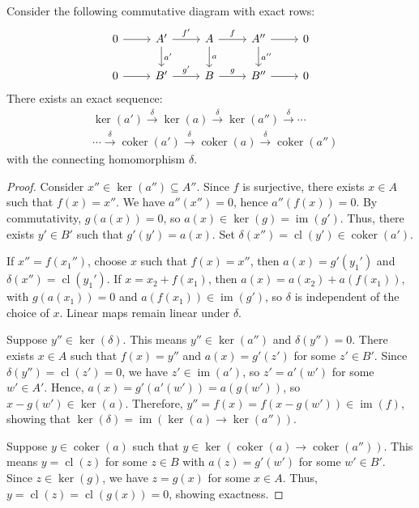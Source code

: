 \begin{lemma}{\cite[\S 1.2.6]{Weibel1994}}
\label{snake}
Consider the following commutative diagram with exact rows:
\begin{equation}
\begin{tikzcd}
0 \arrow[r] & A' \arrow[r, "f'"] \arrow[d, "a'"] & A \arrow[r, "f"] \arrow[d, "a"] & A'' \arrow[r] \arrow[d, "a''"] & 0 \\
0 \arrow[r] & B' \arrow[r, "g'"] & B \arrow[r, "g"] & B'' \arrow[r] & 0
\end{tikzcd}
\end{equation}
There exists an exact sequence:
\begin{align}
&\ker(a') \xrightarrow{\delta} \ker(a) \xrightarrow{\delta} \ker(a'') \xrightarrow{\delta} \cdots \\
&\cdots \xrightarrow{\delta} \operatorname{coker}(a') \xrightarrow{\delta} \operatorname{coker}(a) \xrightarrow{\delta} \operatorname{coker}(a'')
\end{align}
with the connecting homomorphism \(\delta\).
\end{lemma}

\begin{proof}
Consider \( x'' \in \ker(a'') \subseteq A'' \). Since \( f \) is surjective, there exists \( x \in A \) such that \( f(x) = x'' \). We have \( a''(x'') = 0 \), hence \( a''(f(x)) = 0 \). By commutativity, \( g(a(x)) = 0 \), so \( a(x) \in \ker(g) = \operatorname{im}(g') \). Thus, there exists \( y' \in B' \) such that \( g'(y') = a(x) \). Set \( \delta(x'') = \operatorname{cl}(y') \in \operatorname{coker}(a') \).

If \( x'' = f(x_1'') \), choose \( x \) such that \( f(x) = x'' \), then \( a(x) = g'(y_1') \) and \( \delta(x'') = \operatorname{cl}(y_1') \). If \( x = x_2 + f(x_1) \), then \( a(x) = a(x_2) + a(f(x_1)) \), with \( g(a(x_1)) = 0 \) and \( a(f(x_1)) \in \operatorname{im}(g') \), so \( \delta \) is independent of the choice of \( x \). Linear maps remain linear under \( \delta \).

Suppose \( y'' \in \ker(\delta) \). This means \( y'' \in \ker(a'') \) and \( \delta(y'') = 0 \). There exists \( x \in A \) such that \( f(x) = y'' \) and \( a(x) = g'(z') \) for some \( z' \in B' \). Since \( \delta(y'') = \operatorname{cl}(z') = 0 \), we have \( z' \in \operatorname{im}(a') \), so \( z' = a'(w') \) for some \( w' \in A' \). Hence, \( a(x) = g'(a'(w')) = a(g(w')) \), so \( x - g(w') \in \ker(a) \). Therefore, \( y'' = f(x) = f(x - g(w')) \in \operatorname{im}(f) \), showing that \( \ker(\delta) = \operatorname{im}(\ker(a) \rightarrow \ker(a'')) \).

Suppose \( y \in \operatorname{coker}(a) \) such that \( y \in \ker(\operatorname{coker}(a) \rightarrow \operatorname{coker}(a'')) \). This means \( y = \operatorname{cl}(z) \) for some \( z \in B \) with \( a(z) = g'(w') \) for some \( w' \in B' \). Since \( z \in \ker(g) \), we have \( z = g(x) \) for some \( x \in A \). Thus, \( y = \operatorname{cl}(z) = \operatorname{cl}(g(x)) = 0 \), showing exactness.
\end{proof}

